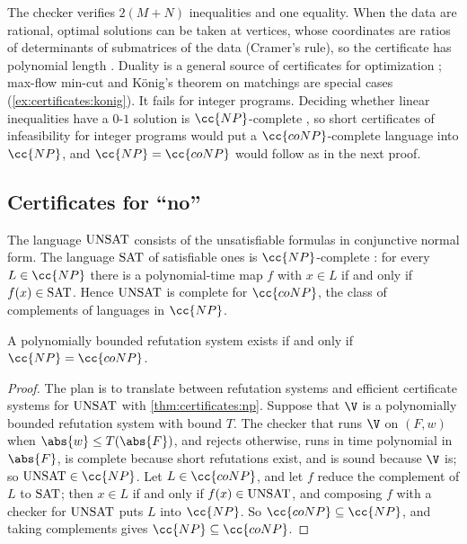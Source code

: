 \begin{refsection}
The checker verifies $2(M+N)$ inequalities and one equality. When the data are rational, optimal solutions can be taken at vertices, whose coordinates are ratios of determinants of submatrices of the data (Cramer's rule), so the certificate has polynomial length \parencite{MatousekGartner2007}. Duality is a general source of certificates for optimization \parencite{McConnellEtAl2011}; max-flow min-cut and König's theorem on matchings are special cases (\cref{ex:certificates:konig}). It fails for integer programs. Deciding whether linear inequalities have a $0$-$1$ solution is $\cc{NP}$-complete \parencite{Karp1972}, so short certificates of infeasibility for integer programs would put a $\cc{coNP}$-complete language into $\cc{NP}$, and $\cc{NP}=\cc{coNP}$ would follow as in the next proof.

\subsection{Certificates for ``no''}

The language $\mathrm{UNSAT}$ consists of the unsatisfiable formulas in conjunctive normal form. The language $\mathrm{SAT}$ of satisfiable ones is $\cc{NP}$-complete \parencite{Cook1971,Levin1973}: for every $L\in\cc{NP}$ there is a polynomial-time map $f$ with $x\in L$ if and only if $f(x)\in\mathrm{SAT}$. Hence $\mathrm{UNSAT}$ is complete for $\cc{coNP}$, the class of complements of languages in $\cc{NP}$.


\begin{theorem}\label{thm:certificates:cookreckhow}
A polynomially bounded refutation system exists if and only if $\cc{NP}=\cc{coNP}$.
\end{theorem}

\begin{proof}
The plan is to translate between refutation systems and efficient certificate systems for $\mathrm{UNSAT}$ with \cref{thm:certificates:np}. Suppose that $\V$ is a polynomially bounded refutation system with bound $T$. The checker that runs $\V$ on $(F,w)$ when $\abs{w}\le T(\abs{F})$, and rejects otherwise, runs in time polynomial in $\abs{F}$, is complete because short refutations exist, and is sound because $\V$ is; so $\certificatesUNSAT\in\cc{NP}$. Let $L\in\cc{coNP}$, and let $f$ reduce the complement of $L$ to $\mathrm{SAT}$; then $x\in L$ if and only if $f(x)\in\mathrm{UNSAT}$, and composing $f$ with a checker for $\mathrm{UNSAT}$ puts $L$ into $\cc{NP}$. So $\cc{coNP}\subseteq\cc{NP}$, and taking complements gives $\cc{NP}\subseteq\cc{coNP}$.


\end{proof}
\end{refsection}
